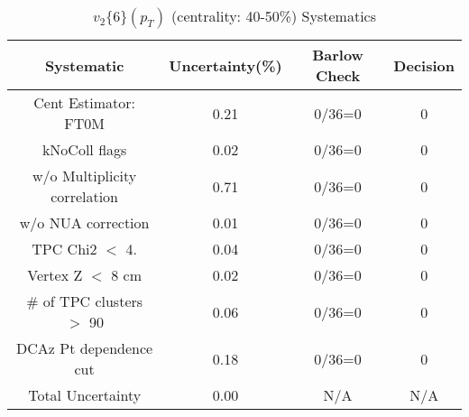 \begin{table}[htbp]
\caption{$v_2\{6\}(p_{T})$ (centrality: 40-50\%) Systematics}
\label{tab:Sys_pTDiffv26ChFull}
\centering
\begin{tabular}{|c|c|c|c|}
\hline
Systematic & Uncertainty(\%) & Barlow Check & Decision \\
\hline
Cent Estimator: FT0M & 0.21 & 0/36=0 & 0 \\
kNoColl flags & 0.02 & 0/36=0 & 0 \\
w/o Multiplicity correlation & 0.71 & 0/36=0 & 0 \\
w/o NUA correction & 0.01 & 0/36=0 & 0 \\
TPC Chi2 $<$ 4. & 0.04 & 0/36=0 & 0 \\
Vertex Z $<$ 8 cm & 0.02 & 0/36=0 & 0 \\
\# of TPC clusters $>$ 90 & 0.06 & 0/36=0 & 0 \\
DCAz Pt dependence cut & 0.18 & 0/36=0 & 0 \\
\hline
Total Uncertainty & 0.00 & N/A & N/A \\
\hline
\end{tabular}
\end{table}

